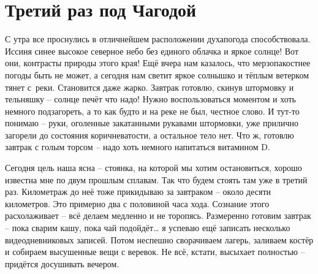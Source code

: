 \chapter{Третий раз под Чагодой} 

С утра все проснулись в отличнейшем расположении духа\ndash погода способствовала. Иссиня синее высокое северное небо без единого облачка и яркое солнце! Вот они, контрасты природы этого края! Ещё вчера нам казалось, что мерзопакостнее погоды быть не может, а сегодня нам светит яркое солнышко и тёплым ветерком тянет с~реки. Становится даже жарко. Завтрак готовлю, скинув штормовку и тельняшку – солнце печёт что надо! Нужно воспользоваться моментом и хоть немного подзагореть, а то как будто и на реке не был, честное слово. И тут-то понимаю – руки, оголенные закатанными рукавами штормовки, уже прилично загорели до состояния коричневатости, а остальное тело нет. Что ж, готовлю завтрак с голым торсом – надо хоть немного напитаться витамином D.

Сегодня цель наша ясна – стоянка, на которой мы хотим остановиться, хорошо известна мне по двум прошлым сплавам. Так что будем стоять там уже в третий раз. Километраж до неё тоже прикидываю за завтраком – около десяти километров. Это примерно два с половиной часа хода. Сознание этого расхолаживает – всё делаем медленно и не торопясь. Размеренно готовим завтрак – пока сварим кашу, пока чай подойдёт… я успеваю ещё записать несколько видеодневниковых записей. Потом неспешно сворачиваем лагерь, заливаем костёр и собираем высушенные вещи с веревок. Не всё, кстати, высыхает полностью – придётся досушивать вечером.

